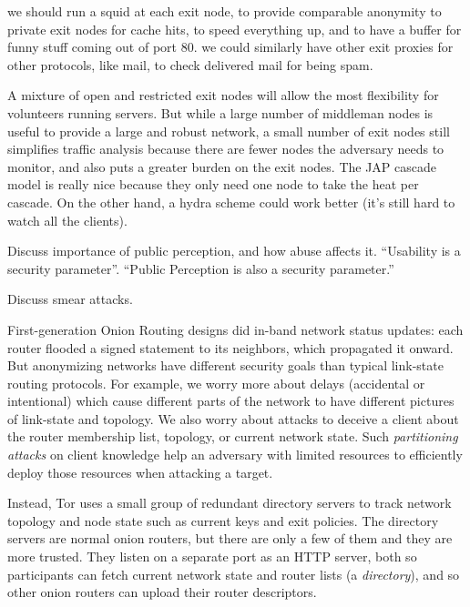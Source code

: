 \documentclass[times,10pt,twocolumn]{article}
\begin{document}
we should run a squid at each exit node, to provide comparable anonymity
to private exit nodes for cache hits, to speed everything up, and to
have a buffer for funny stuff coming out of port 80. we could similarly
have other exit proxies for other protocols, like mail, to check
delivered mail for being spam.

A mixture of open and restricted exit nodes will allow the most
flexibility for volunteers running servers. But while a large number
of middleman nodes is useful to provide a large and robust network,
a small number of exit nodes still simplifies traffic analysis because
there are fewer nodes the adversary needs to monitor, and also puts a
greater burden on the exit nodes.
The JAP cascade model is really nice because they only need one node to
take the heat per cascade. On the other hand, a hydra scheme could work
better (it's still hard to watch all the clients).

Discuss importance of public perception, and how abuse affects it.
``Usability is a security parameter''.  ``Public Perception is also a
security parameter.''

Discuss smear attacks.

\label{subsec:dirservers}

First-generation Onion Routing designs \cite{or-jsac98,freedom2-arch} did
in-band network status updates: each router flooded a signed statement
to its neighbors, which propagated it onward. But anonymizing networks
have different security goals than typical link-state routing protocols.
For example, we worry more about delays (accidental or intentional)
which cause different parts of the network to have different pictures
of link-state and topology. We also worry about attacks to deceive a
client about the router membership list, topology, or current network
state. Such \emph{partitioning attacks} on client knowledge help an
adversary with limited resources to efficiently deploy those resources
when attacking a target.

Instead, Tor uses a small group of redundant directory servers to
track network topology and node state such as current keys and exit
policies. The directory servers are normal onion routers, but there are
only a few of them and they are more trusted. They listen on a separate
port as an HTTP server, both so participants can fetch current network
state and router lists (a \emph{directory}), and so other onion routers
can upload their router descriptors.
\end{document}
